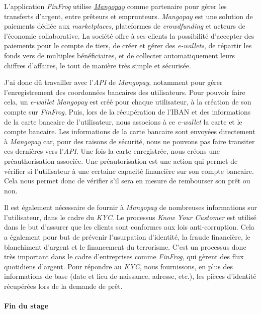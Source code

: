 L'application \emph{FinFrog} utilise
\href{https://www.mangopay.com/fr/}{\emph{Mangopay}} comme partenaire
pour gérer les transferts d'argent, entre prêteurs et emprunteurs.
\emph{Mangopay} est une solution de paiements dédiée aux
\emph{marketplaces}, plateformes de \emph{crowdfunding} et acteurs de
l'économie collaborative. La société offre à ses clients la possibilité
d'accepter des paiements pour le compte de tiers, de créer et gérer des
\emph{e-wallets}, de répartir les fonds vers de multiples bénéficiaires,
et de collecter automatiquement leurs chiffres d'affaires, le tout de
manière très simple et sécurisée.

\bigskip

J'ai donc dû travailler avec l'\emph{API} de \emph{Mangopay}, notamment
pour gérer l'enregistrement des coordonnées bancaires des utilisateurs.
Pour pouvoir faire cela, un \emph{e-wallet} \emph{Mangopay} est créé
pour chaque utilisateur, à la création de son compte sur \emph{FinFrog}.
Puis, lors de la récupération de l'IBAN et des informations de la carte
bancaire de l'utilisateur, nous associons à ce \emph{e-wallet} la carte
et le compte bancaire. Les informations de la carte bancaire sont
envoyées directement à \emph{Mangopay} car, pour des raisons de
sécurité, nous ne pouvons pas faire transiter ces dernières vers
l'\emph{API}. Une fois la carte enregistrée, nous créons une
préauthorisation associée. Une préautorisation est une action qui permet
de vérifier si l'utilisateur à une certaine capacité financière sur son
compte bancaire. Cela nous permet donc de vérifier s'il sera en mesure
de rembourser son prêt ou non.

\bigskip

Il est également nécessaire de fournir à \emph{Mangopay} de nombreuses
informations sur l'utilisateur, dans le cadre du \emph{KYC}. Le
processus \emph{Know Your Customer} est utilisé dans le but d'assurer
que les clients sont conformes aux lois anti-corruption. Cela a
également pour but de prévenir l'usurpation d'identité, la fraude
financière, le blanchiment d'argent et le financement du terrorisme.
C'est un processus donc très important dans le cadre d'entreprises comme
\emph{FinFrog}, qui gèrent des flux quotidiens d'argent. Pour répondre
au \emph{KYC}, nous fournissons, en plus des informations de base (date
et lieu de naissance, adresse, etc.), les pièces d'identité récupérées
lors de la demande de prêt.

\bigskip

\paragraph{Fin du stage}\label{fin-du-stage}

